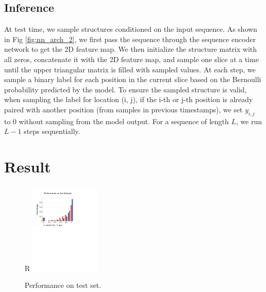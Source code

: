 \documentclass{article}
\begin{document}



\subsection{Inference} \label{sec:inference}


At test time, we sample structures conditioned on the input sequence.
As shown in Fig \ref{fig:nn_arch_2}, we first pass the sequence through the
sequence encoder network to get the 2D feature map.
We then initialize the structure matrix with all zeros, concatenate it with the 2D feature map,
and sample one slice at a time until the upper triangular matrix is filled with sampled values.
At each step, we sample a binary label for each position in the current slice based on the
Bernoulli probability predicted by the model.
To ensure the sampled structure is valid, when sampling the label for location (i, j),
if the i-th or j-th position is already paired with another position (from samples in previous timestamps),
 we set $y_{i, j}$ to $0$ without sampling from the model output.
For a sequence of length $L$, we run $L-1$ steps sequentially.




\section{Result}


\begin{figure}{R}
    \centering
    \includegraphics[width=0.3\textwidth]{plot/performance_test_set.pdf}
    \caption{Performance on test set.}
    \label{fig:performance_test_set}
    \centering
\end{figure}
\end{document}
